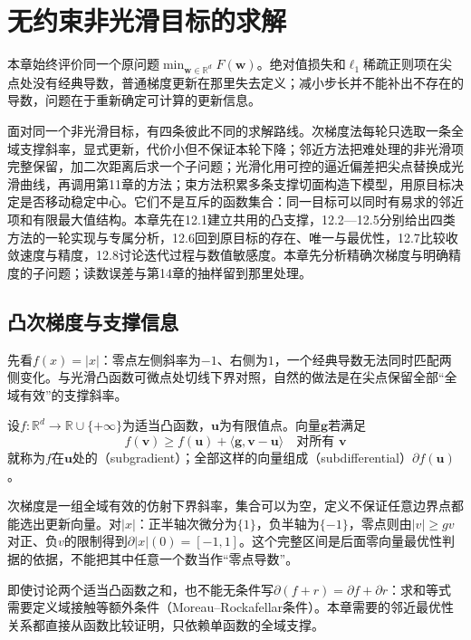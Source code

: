 \chapter{无约束非光滑目标的求解}
\label{chap:nonsmooth-optimization}

本章始终评价同一个原问题$\min_{\bm w\in\mathbb R^d}F(\bm w)$。绝对值损失和$\ell_1$稀疏正则项在尖点处没有经典导数，普通梯度更新在那里失去定义；减小步长并不能补出不存在的导数，问题在于重新确定可计算的更新信息。

面对同一个非光滑目标，有四条彼此不同的求解路线。次梯度法每轮只选取一条全域支撑斜率，显式更新，代价小但不保证本轮下降；邻近方法把难处理的非光滑项完整保留，加二次距离后求一个子问题；光滑化用可控的逼近偏差把尖点替换成光滑曲线，再调用第11章的方法；束方法积累多条支撑切面构造下模型，用原目标决定是否移动稳定中心。它们不是互斥的函数集合：同一目标可以同时有易求的邻近项和有限最大值结构。本章先在12.1建立共用的凸支撑，12.2—12.5分别给出四类方法的一轮实现与专属分析，12.6回到原目标的存在、唯一与最优性，12.7比较收敛速度与精度，12.8讨论迭代过程与数值敏感度。本章先分析精确次梯度与明确精度的子问题；读数误差与第14章的抽样留到那里处理。

\section{凸次梯度与支撑信息}

先看$f(x)=|x|$：零点左侧斜率为$-1$、右侧为$1$，一个经典导数无法同时匹配两侧变化。与光滑凸函数可微点处切线下界对照，自然的做法是在尖点保留全部“全域有效”的支撑斜率。

\begin{definition}[凸次梯度与次微分]
\label{def:opt-convex-subgradient}
设$f:\mathbb R^d\to\mathbb R\cup\{+\infty\}$为适当凸函数，$\bm u$为有限值点。向量$\bm g$若满足
\[
 f(\bm v)\geq f(\bm u)+\langle\bm g,\bm v-\bm u\rangle
 \quad\text{对所有 }\bm v
\]
就称为$f$在$\bm u$处的（subgradient）；全部这样的向量组成（subdifferential）$\partial f(\bm u)$。
\end{definition}

次梯度是一组全域有效的仿射下界斜率，集合可以为空，定义不保证任意边界点都能选出更新向量。对$|x|$：正半轴次微分为$\{1\}$，负半轴为$\{-1\}$，零点则由$|v|\geq gv$对正、负$v$的限制得到$\partial|x|(0)=[-1,1]$。这个完整区间是后面零向量最优性判据的依据，不能把其中任意一个数当作“零点导数”。

即使讨论两个适当凸函数之和，也不能无条件写$\partial(f+r)=\partial f+\partial r$：求和等式需要定义域接触等额外条件（Moreau--Rockafellar条件）。本章需要的邻近最优性关系都直接从函数比较证明，只依赖单函数的全域支撑。

